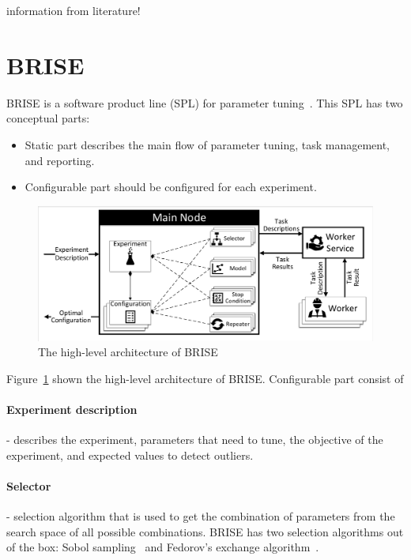 information from literature!

\section{BRISE}

BRISE is a software product line (SPL) for parameter tuning~\cite{pukhkaiev19}.
This SPL has two conceptual parts:

\begin{itemize}
	\item Static part describes the main flow of parameter tuning, task management, and reporting.
	\item Configurable part should be configured for each experiment.
\end{itemize}

\begin{figure}
	\centering
	\includegraphics[width=\textwidth]{images/BRISEarch.pdf}
	\caption[The high-level architecture of BRISE]{The high-level architecture of BRISE}
	\label{fig:BRISEarch}
\end{figure}

Figure~\ref{fig:BRISEarch} shown the high-level architecture of BRISE.
Configurable part consist of 
	\paragraph{Experiment description} - describes the experiment, parameters that need to tune, the objective of the experiment, and expected values to detect outliers.
	\paragraph{Selector} - selection algorithm that is used to get the combination of parameters from the search space of all possible combinations. BRISE has two selection algorithms out of the box: Sobol sampling~\cite{sobol99} and Fedorov's exchange algorithm~\cite{fedorov13}. 

